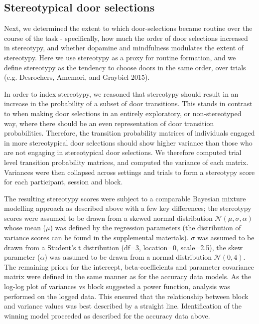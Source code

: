 \documentclass{article}
\begin{document}
\hypertarget{stereotypical-door-selections}{%
\subsection{Stereotypical door
selections}\label{stereotypical-door-selections}}

Next, we determined the extent to which door-selections became routine
over the course of the task - specifically, how much the order of door
selections increased in stereotypy, and whether dopamine and mindfulness
modulates the extent of stereotypy. Here we use stereotypy as a proxy
for routine formation, and we define stereotypy as the tendency to
choose doors in the same order, over trials (e.g. Desrochers, Amemori,
and Graybiel 2015).

In order to index stereotypy, we reasoned that stereotypy should result
in an increase in the probability of a subset of door transitions. This
stands in contrast to when making door selections in an entirely
exploratory, or non-stereotyped way, where there should be an even
representation of door transition probabilities. Therefore, the
transition probability matrices of individuals engaged in more
stereotypical door selections should show higher variance than those who
are not engaging in stereotypical door selections. We therefore computed
trial level transition probability matrices, and computed the variance
of each matrix. Variances were then collapsed across settings and trials
to form a stereotypy score for each participant, session and block.

The resulting stereotypy scores were subject to a comparable Bayesian
mixture modelling approach as described above with a few key
differences; the stereotypy scores were assumed to be drawn from a
skewed normal distribution \(\mathcal{N}(\mu, \sigma, \alpha)\) whose
mean (\(\mu\)) was defined by the regression parameters (the
distribution of variance scores can be found in the supplemental
materials). \(\sigma\) was assumed to be drawn from a Student's t
distribution (df=3, location=0, scale=2.5), the skew parameter
(\(\alpha\)) was assumed to be drawn from a normal distribution
\(\mathcal{N}(0,4)\). The remaining priors for the intercept,
beta-coefficients and parameter covariance matrix were defined in the
same manner as for the accuracy data models. As the log-log plot of
variances vs block suggested a power function, analysis was performed on
the logged data. This ensured that the relationship between block and
variance values was best described by a straight line. Identification of
the winning model proceeded as described for the accuracy data above.
\end{document}
